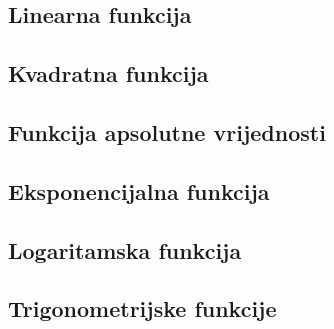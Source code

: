 \subsection{Linearna funkcija}
    
\subsection{Kvadratna funkcija}
    
\subsection{Funkcija apsolutne vrijednosti}
    
\subsection{Eksponencijalna funkcija}
    
\subsection{Logaritamska funkcija}
    
\subsection{Trigonometrijske funkcije}
    